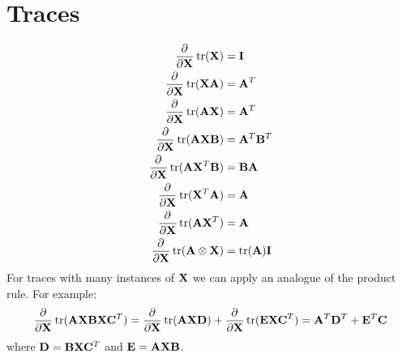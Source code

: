\section{Traces}
\begin{align}
\pd{}{\mX}\trace(\mX)             &=\mI            \\
\pd{}{\mX}\trace(\mX\mA)          &=\mA^T          \\
\pd{}{\mX}\trace(\mA\mX)          &=\mA^T          \\
\pd{}{\mX}\trace(\mA\mX\mB)       &=\mA^T\mB^T     \\
\pd{}{\mX}\trace(\mA\mX^T\mB)     &=\mB\mA         \\
\pd{}{\mX}\trace(\mX^T\mA)        &=\mA            \\
\pd{}{\mX}\trace(\mA\mX^T)        &=\mA            \\
\pd{}{\mX}\trace(\mA\kp\mX)       &=\trace(\mA)\mI 
\end{align}
For traces with many instances of $\mX$ we can apply an analogue of the product rule. For example:
\begin{equation}
\pd{}{\mX}\trace(\mA\mX\mB\mX\mC^T)=\pd{}{\mX}\trace(\mA\mX\mD)+\pd{}{\mX}\trace(\mE\mX\mC^T)=\mA^T\mD^T+\mE^T\mC
\end{equation}
where $\mD=\mB\mX\mC^T$ and $\mE=\mA\mX\mB$.